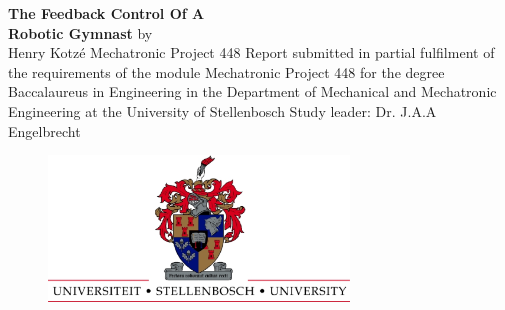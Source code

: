 
\begin{titlingpage}
	
	{	\centering
		\vfill
		\textbf{\Huge
			The Feedback Control Of A\\ 
			\vskip0.5cm
			Robotic Gymnast}
		\vskip0.5cm
		\normalsize by \\
		\vskip0.5cm
		\Large Henry Kotz\'{e} 
		\vskip1cm
		\large Mechatronic Project 448 
		\vskip2cm
		\small Report submitted in partial fulfilment of the requirements of
		the module Mechatronic Project 448 for the degree Baccalaureus in
		Engineering in the Department of Mechanical and Mechatronic
		Engineering at the University of Stellenbosch 
		\vskip2cm
		\large Study leader: Dr. J.A.A Engelbrecht\\
		\vskip2cm
	}    
	\vfill
	\begin{figure}[t!]
		\includegraphics[width=8cm]{UScrest-top.eps}
		\centering
		\vskip0.5cm
	\end{figure}
	\vfill
	\vfill
	{\centering {\large \today\par} }
\end{titlingpage}